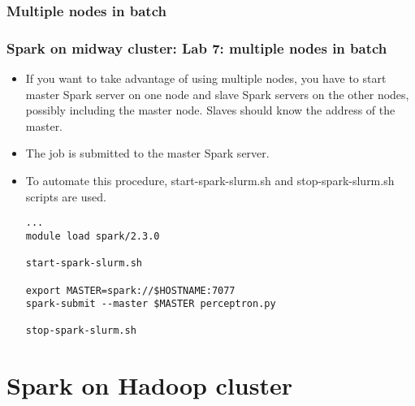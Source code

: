 \documentclass{beamer}
\begin{document}
\begin{frame}[fragile]
\begin{itemize}
\subsubsection{Multiple nodes in batch}
\begin{frame}[fragile]
  \frametitle{Spark on midway cluster: Lab 7: multiple nodes in batch}
  \begin{itemize}
  \item If you want to take advantage of using multiple nodes, 
    you have to start master Spark server on one node and slave Spark servers on the other nodes, 
    possibly including the master node. Slaves should know the address of the master.
  \item The job is submitted to the master Spark server. 
  \item To automate this procedure, {\color{mycolorcli}start-spark-slurm.sh} 
    and {\color{mycolorcli}stop-spark-slurm.sh} scripts are used.
{\color{mycolorcli}
\begin{verbatim}
...
module load spark/2.3.0

start-spark-slurm.sh

export MASTER=spark://$HOSTNAME:7077
spark-submit --master $MASTER perceptron.py

stop-spark-slurm.sh
\end{verbatim}
}

  \end{itemize}


\end{frame}


\section{Spark on Hadoop cluster}

\end{itemize}
\end{frame}
\end{document}
